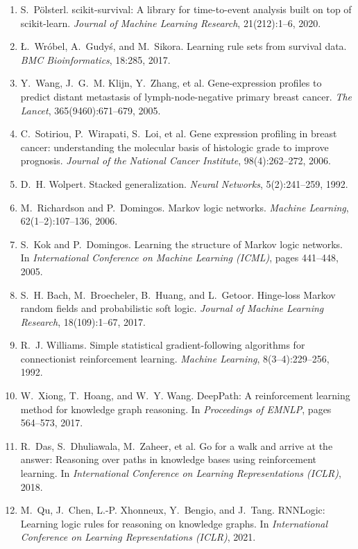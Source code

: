 \documentclass{mnnit}
\begin{document}
\begin{enumerate}
\item\label{ref:sksurv} S.~P\"olsterl. scikit-survival: A library for time-to-event analysis built on top of scikit-learn. \emph{Journal of Machine Learning Research}, 21(212):1--6, 2020.
\item\label{ref:lrrules} \L.~Wr\'obel, A.~Gudy\'s, and M.~Sikora. Learning rule sets from survival data. \emph{BMC Bioinformatics}, 18:285, 2017.
\item\label{ref:gse2034} Y.~Wang, J.~G.~M. Klijn, Y.~Zhang, et al. Gene-expression profiles to predict distant metastasis of lymph-node-negative primary breast cancer. \emph{The Lancet}, 365(9460):671--679, 2005.
\item\label{ref:gse2990} C.~Sotiriou, P.~Wirapati, S.~Loi, et al. Gene expression profiling in breast cancer: understanding the molecular basis of histologic grade to improve prognosis. \emph{Journal of the National Cancer Institute}, 98(4):262--272, 2006.
\item\label{ref:stacking} D.~H. Wolpert. Stacked generalization. \emph{Neural Networks}, 5(2):241--259, 1992.
\item\label{ref:mln} M.~Richardson and P.~Domingos. Markov logic networks. \emph{Machine Learning}, 62(1--2):107--136, 2006.
\item\label{ref:mlnstructure} S.~Kok and P.~Domingos. Learning the structure of Markov logic networks. In \emph{International Conference on Machine Learning (ICML)}, pages 441--448, 2005.
\item\label{ref:psl} S.~H. Bach, M.~Broecheler, B.~Huang, and L.~Getoor. Hinge-loss Markov random fields and probabilistic soft logic. \emph{Journal of Machine Learning Research}, 18(109):1--67, 2017.
\item\label{ref:reinforce} R.~J. Williams. Simple statistical gradient-following algorithms for connectionist reinforcement learning. \emph{Machine Learning}, 8(3--4):229--256, 1992.
\item\label{ref:deeppath} W.~Xiong, T.~Hoang, and W.~Y. Wang. DeepPath: A reinforcement learning method for knowledge graph reasoning. In \emph{Proceedings of EMNLP}, pages 564--573, 2017.
\item\label{ref:minerva} R.~Das, S.~Dhuliawala, M.~Zaheer, et al. Go for a walk and arrive at the answer: Reasoning over paths in knowledge bases using reinforcement learning. In \emph{International Conference on Learning Representations (ICLR)}, 2018.
\item\label{ref:rnnlogic} M.~Qu, J.~Chen, L.-P. Xhonneux, Y.~Bengio, and J.~Tang. RNNLogic: Learning logic rules for reasoning on knowledge graphs. In \emph{International Conference on Learning Representations (ICLR)}, 2021.

\end{enumerate}
\end{document}
